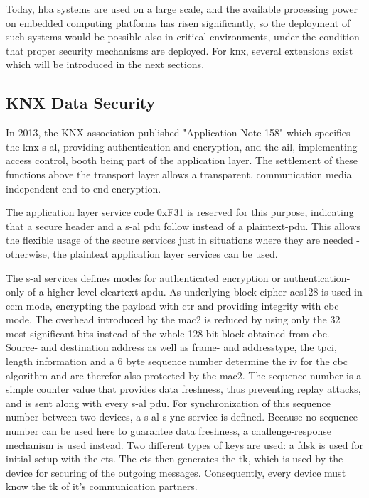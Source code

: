 Today, \gls{hba} systems are used on a large scale, and the available processing power on embedded computing platforms has risen significantly, so the deployment
of such systems would be possible also in critical environments, under the condition that proper security mechanisms are deployed. For \gls{knx}, several extensions
exist which will be introduced in the next sections.

\subsection{KNX Data Security}

In 2013, the KNX association published "Application Note 158" \cite{knx_data_sec} which specifies the \gls{knx} \gls{s-al}, providing
authentication and encryption, and the \gls{ail}, implementing access control, booth being part of the application layer.
The settlement of these functions above the transport layer allows a transparent, communication media independent end-to-end encryption.

The application layer service code 0xF31 is reserved for this purpose, indicating that a secure header and a \gls{s-al} \gls{pdu} 
follow instead of a plaintext-\gls{pdu}. This allows the flexible usage of the secure services just in situations where they are needed - otherwise, the plaintext application
layer services can be used.

The \gls{s-al} services defines modes for authenticated encryption or authentication-only of a higher-level cleartext \gls{apdu}. As underlying block cipher
\gls{aes}128 is used in \gls{ccm} mode, encrypting the payload with \gls{ctr} and providing integrity with \gls{cbc} mode. The overhead introduced by the 
\gls{mac2} is reduced by 
using only the 32 most significant bits instead of the whole 128 bit block obtained from \gls{cbc}. Source- and destination address as well as
frame- and addresstype, the \gls{tpci}, length information and a 6 byte sequence number determine the \gls{iv} for the \gls{cbc} algorithm and are therefor also protected by the \gls{mac2}.
The sequence number is a simple counter value that provides data freshness, thus preventing replay attacks, and is sent along with every \gls{s-al} \gls{pdu}.
For synchronization of this sequence number between two devices, a \gls{s-al} s	ync-service is defined. Because no sequence number can be used here to guarantee
data freshness, a challenge-response mechanism is used instead.
Two different types of keys are used: a \gls{fdsk} is used for initial setup with the \gls{ets}. The \gls{ets} then generates the \gls{tk}, which is used by the
device for securing of the outgoing messages. Consequently, every device must know the \gls{tk} of it's communication partners.

